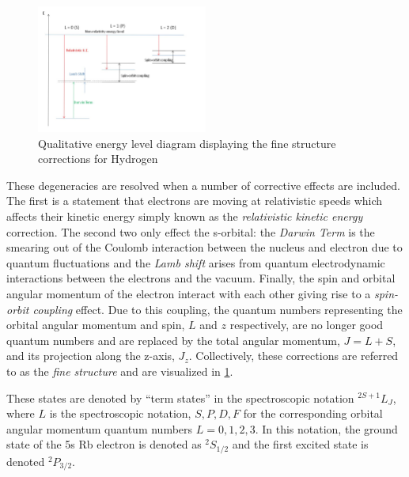 \documentclass[12pt]{article}
\begin{document}
	\begin{figure}
		\includegraphics[width=0.5\textwidth]{Fine_Structure/HydrogenFineStructure1.jpg}
		\caption{Qualitative energy level diagram displaying the fine structure corrections for Hydrogen}
		\label{HydrogenFine}
	\end{figure}
	
	These degeneracies are resolved when a number of corrective effects are included. The first is a statement that electrons are moving at relativistic speeds which affects their kinetic energy simply known as the \emph{relativistic kinetic energy} correction. The second two only effect the s-orbital: the \emph{Darwin Term} is the smearing out of the Coulomb interaction between the nucleus and electron due to quantum fluctuations and the \emph{Lamb shift} arises from quantum electrodynamic interactions between the electrons and the vacuum. Finally, the spin and orbital angular momentum of the electron interact with each other giving rise to a \emph{spin-orbit coupling} effect. Due to this coupling, the quantum numbers representing the orbital angular momentum and spin, $L$ and $z$ respectively, are no longer good quantum numbers and are replaced by the total angular momentum, $J = L + S$, and its projection along the z-axis, $J_z$. Collectively, these corrections are referred to as the \emph{fine structure} and are visualized in \cref{HydrogenFine}.
	
	These states are denoted by ``term states'' in the spectroscopic notation $^{2S+1}L_J$, where $L$ is the spectroscopic notation, $S,P,D,F$ for the corresponding orbital angular momentum quantum numbers $L=0,1,2,3$. In this notation, the ground state of the 5s Rb electron is denoted as $^2S_{1/2}$ and the first excited state is denoted $^2P_{3/2}$.
\end{document}
